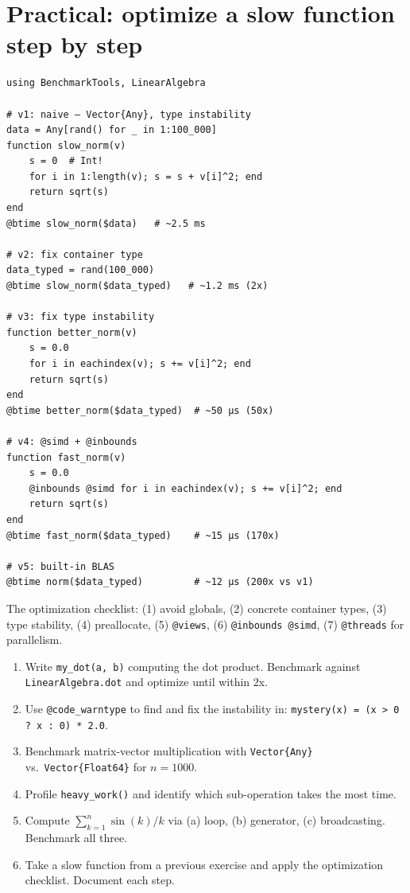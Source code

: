 \section{Practical: optimize a slow function step by step}

\begin{verbatim}
using BenchmarkTools, LinearAlgebra

# v1: naive — Vector{Any}, type instability
data = Any[rand() for _ in 1:100_000]
function slow_norm(v)
    s = 0  # Int!
    for i in 1:length(v); s = s + v[i]^2; end
    return sqrt(s)
end
@btime slow_norm($data)   # ~2.5 ms

# v2: fix container type
data_typed = rand(100_000)
@btime slow_norm($data_typed)   # ~1.2 ms (2x)

# v3: fix type instability
function better_norm(v)
    s = 0.0
    for i in eachindex(v); s += v[i]^2; end
    return sqrt(s)
end
@btime better_norm($data_typed)  # ~50 μs (50x)

# v4: @simd + @inbounds
function fast_norm(v)
    s = 0.0
    @inbounds @simd for i in eachindex(v); s += v[i]^2; end
    return sqrt(s)
end
@btime fast_norm($data_typed)    # ~15 μs (170x)

# v5: built-in BLAS
@btime norm($data_typed)         # ~12 μs (200x vs v1)
\end{verbatim}

\begin{performancetip}
The optimization checklist: (1) avoid globals, (2) concrete container types, (3) type stability, (4) preallocate, (5) \texttt{@views}, (6) \texttt{@inbounds @simd}, (7) \texttt{@threads} for parallelism.
\end{performancetip}

\begin{exercise}
\begin{enumerate}
  \item Write \texttt{my\_dot(a, b)} computing the dot product. Benchmark against \texttt{LinearAlgebra.dot} and optimize until within 2x.
  \item Use \texttt{@code\_warntype} to find and fix the instability in: \texttt{mystery(x) = (x > 0 ? x : 0) * 2.0}.
  \item Benchmark matrix-vector multiplication with \texttt{Vector\{Any\}} vs.\ \texttt{Vector\{Float64\}} for $n=1000$.
  \item Profile \texttt{heavy\_work()} and identify which sub-operation takes the most time.
  \item Compute $\sum_{k=1}^{n} \sin(k)/k$ via (a) loop, (b) generator, (c) broadcasting. Benchmark all three.
  \item Take a slow function from a previous exercise and apply the optimization checklist. Document each step.
\end{enumerate}
\end{exercise}

